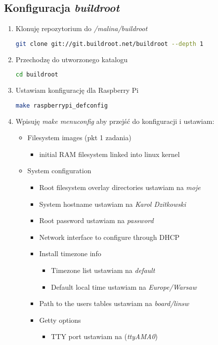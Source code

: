 \subsection{Konfiguracja \emph{buildroot}}
\begin{enumerate}
	\item Klonuję repozytorium do \emph{/malina/buildroot}
	\begin{lstlisting}[language=bash]
	git clone git://git.buildroot.net/buildroot --depth 1
	\end{lstlisting}
	\item Przechodzę do utworzonego katalogu
	\begin{lstlisting}[language=bash]
	cd buildroot
	\end{lstlisting}	
	\item Ustawiam konfigurację dla Raspberry Pi
	\begin{lstlisting}[language=bash]
	make raspberrypi_defconfig
	\end{lstlisting}	
	\item Wpisuję \emph{make menuconfig} aby przejść do konfiguracji i ustawiam:
	\begin{itemize}	
		\item Filesystem images (pkt 1 zadania)
		\begin{itemize}
			\item initial RAM filesystem linked into linux kernel
		\end{itemize}
		
		\item System configuration
		\begin{itemize}
			\item Root filesystem overlay directories ustawiam na \emph{moje}
			\item System hostname ustawiam na \emph{Karol Dzitkowski}
			\item Root password ustawiam na \emph{password}
			\item Network interface to configure through DHCP
			\item Install timezone info
				\begin{itemize}
				\item Timezone list ustawiam na \emph{default}
				\item Default local time ustawiam na \emph{Europe/Warsaw}
				\end{itemize}
			\item Path to the users tables ustawiam na \emph{board/linsw}
			\item Getty options 
			\begin{itemize}
				\item TTY port ustawiam na (\emph{ttyAMA0})
			\end{itemize}
		\end{itemize}
		

\end{itemize}
\end{enumerate}
